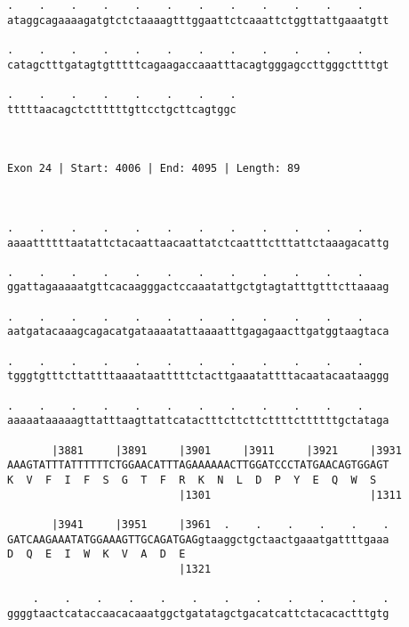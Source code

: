 \documentclass{article}
\begin{document}
\begin{Verbatim}
.    .    .    .    .    .    .    .    .    .    .    .    
ataggcagaaaagatgtctctaaaagtttggaattctcaaattctggttattgaaatgtt
                                                            
.    .    .    .    .    .    .    .    .    .    .    .    
catagctttgatagtgtttttcagaagaccaaatttacagtgggagccttgggcttttgt
                                                            
.    .    .    .    .    .    .    .
tttttaacagctcttttttgttcctgcttcagtggc
                                    
                                    
 
Exon 24 | Start: 4006 | End: 4095 | Length: 89



.    .    .    .    .    .    .    .    .    .    .    .    
aaaattttttaatattctacaattaacaattatctcaatttctttattctaaagacattg
                                                            
.    .    .    .    .    .    .    .    .    .    .    .    
ggattagaaaaatgttcacaagggactccaaatattgctgtagtatttgtttcttaaaag
                                                            
.    .    .    .    .    .    .    .    .    .    .    .    
aatgatacaaagcagacatgataaaatattaaaatttgagagaacttgatggtaagtaca
                                                            
.    .    .    .    .    .    .    .    .    .    .    .    
tgggtgtttcttattttaaaataatttttctacttgaaatattttacaatacaataaggg
                                                            
.    .    .    .    .    .    .    .    .    .    .    .    
aaaaataaaaagttatttaagttattcatactttcttcttcttttcttttttgctataga
                                                            
       |3881     |3891     |3901     |3911     |3921     |3931
AAAGTATTTATTTTTTCTGGAACATTTAGAAAAAACTTGGATCCCTATGAACAGTGGAGT
K  V  F  I  F  S  G  T  F  R  K  N  L  D  P  Y  E  Q  W  S  
                           |1301                         |1311
  
       |3941     |3951     |3961  .    .    .    .    .    .
GATCAAGAAATATGGAAAGTTGCAGATGAGgtaaggctgctaactgaaatgattttgaaa
D  Q  E  I  W  K  V  A  D  E                                
                           |1321                            
  
    .    .    .    .    .    .    .    .    .    .    .    .
ggggtaactcataccaacacaaatggctgatatagctgacatcattctacacactttgtg
                                                            

\end{Verbatim}
\end{document}
